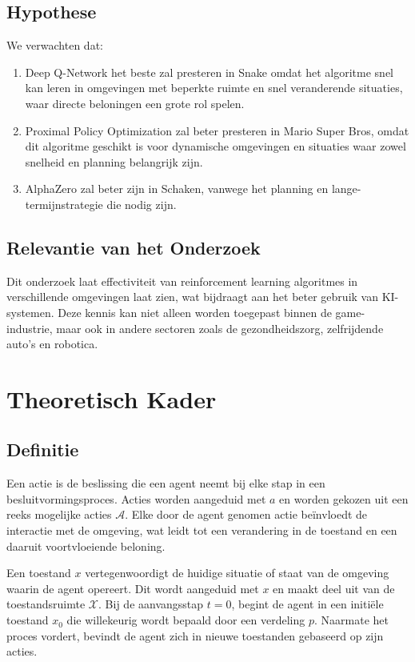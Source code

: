 \documentclass[a4paper,12pt]{report}
\begin{document}
\section{Hypothese}
We verwachten dat:
\begin{enumerate}
    \item Deep Q-Network het beste zal presteren in Snake omdat het algoritme snel kan
          leren in omgevingen met beperkte ruimte en snel veranderende situaties, waar
          directe beloningen een grote rol spelen.

    \item Proximal Policy Optimization zal beter presteren in Mario Super Bros, omdat dit
          algoritme geschikt is voor dynamische omgevingen en situaties waar zowel
          snelheid en planning belangrijk zijn.

    \item AlphaZero zal beter zijn in Schaken, vanwege het planning en
          lange-termijnstrategie die nodig zijn.

\end{enumerate}

\section{Relevantie van het Onderzoek}
Dit onderzoek laat effectiviteit van reinforcement learning algoritmes in
verschillende omgevingen laat zien, wat bijdraagt aan het beter gebruik van
KI-systemen. Deze kennis kan niet alleen worden toegepast binnen de
game-industrie, maar ook in andere sectoren zoals de gezondheidszorg,
zelfrijdende auto's en robotica.

\chapter{Theoretisch Kader}

\section{Definitie}
Een actie is de beslissing die een agent neemt bij elke stap in een
besluitvormingsproces. Acties worden aangeduid met \( a \) en worden gekozen
uit een reeks mogelijke acties \( \mathcal{A} \). Elke door de agent genomen
actie beïnvloedt de interactie met de omgeving, wat leidt tot een verandering
in de toestand en een daaruit voortvloeiende beloning.

Een toestand \( x \) vertegenwoordigt de huidige situatie of staat van de
omgeving waarin de agent opereert. Dit wordt aangeduid met \( x \) en maakt
deel uit van de toestandsruimte \( \mathcal{X} \). Bij de aanvangsstap \( t = 0
\), begint de agent in een initiële toestand \( x_0 \) die willekeurig wordt
bepaald door een verdeling \( p \). Naarmate het proces vordert, bevindt de
agent zich in nieuwe toestanden gebaseerd op zijn acties.
\end{document}
